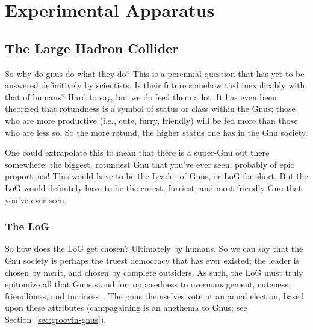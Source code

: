 %
%
%
%
%
%
%
%
%
%

%
%

\chapter{Experimental Apparatus}
\label{chap:experiment}

\section{The Large Hadron Collider }
\label{sec:SM}
So why do gnus do what they do?  This is a perennial question that has
yet to be answered definitively by scientists.  Is their future
somehow tied inexplicably with that of humans?  Hard to say, but we do
feed them a lot.  It has even been theorized that rotundness is a
symbol of status or class within the Gnus; those who are more
productive (i.e., cute, furry, friendly) will be fed more than those
who are less so.  So the more rotund, the higher status one has in the
Gnu society.

One could extrapolate this to mean that there is a super-Gnu out there
somewhere; the biggest, rotundest Gnu that you've ever seen, probably
of epic proportions!  This would have to be the Leader of Gnus, or LoG
for short.  But the LoG would definitely have to be the cutest,
furriest, and most friendly Gnu that you've ever seen.

\subsection{The LoG}

So how does the LoG get chosen?  Ultimately by humans.  So we can say
that the Gnu society is perhaps the truest democracy that has ever
existed; the leader is chosen by merit, and chosen by complete
outsiders.  As such, the LoG must truly epitomize all that Gnus stand
for: opposedness to overmanagement, cuteness, friendliness, and
furriness~\citep{gloonson98:_gnuly_discov_gnus}.  The gnus themselves
vote at an anual election, based upon these attributes (campagaining
is an anethema to Gnus; see Section~\ref{sec:groovin-gnus}).

